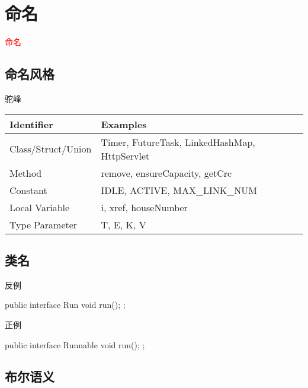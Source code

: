\section{命名}
\label{sec:bad-smells}

\begin{frame}
  \begin{center}
    \Huge{\textcolor{red}{命名}}
  \end{center}
\end{frame}

\subsection{命名风格}

\begin{frame}[fragile]{驼峰}
\begin{table}[!htb]
\begin{tabular*}{1.0\textwidth}{@{}ll@{}}
\hline
Identifier & Examples \\
\hline
Class/Struct/Union & Timer, FutureTask, LinkedHashMap, HttpServlet \\ 
Method & remove, ensureCapacity, getCrc \\
Constant & IDLE, ACTIVE, MAX\_LINK\_NUM \\
Local Variable & i, xref, houseNumber \\
Type Parameter & T, E, K, V \\
\hline
\end{tabular*}
\end{table}
\end{frame}

\subsection{类名}

\begin{frame}[fragile]{反例}
  \begin{java}
public interface Run {
  void run();
};
  \end{java}
\end{frame}

\begin{frame}[fragile]{正例}
  \begin{java}
public interface Runnable {
  void run();
};
  \end{java}
\end{frame}

\subsection{布尔语义}

